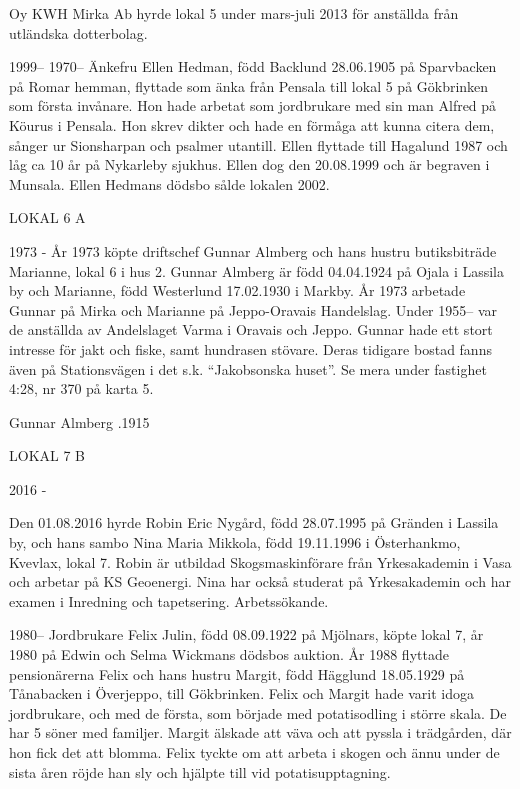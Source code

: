 Oy KWH Mirka Ab hyrde lokal 5 under mars-juli 2013 för anställda från utländska dotterbolag.

 1999--
 1970--
Änkefru Ellen Hedman, född Backlund 28.06.1905 på Sparvbacken på Romar hemman, flyttade som änka från Pensala till lokal 5 på Gökbrinken som första invånare. Hon hade arbetat som jordbrukare med sin man Alfred på Köurus i Pensala. Hon skrev dikter och hade en förmåga att kunna citera dem, sånger ur Sionsharpan och psalmer utantill. Ellen flyttade till Hagalund 1987 och låg ca 10 år på Nykarleby sjukhus. Ellen dog den 20.08.1999 och är begraven i Munsala.
Ellen Hedmans dödsbo sålde lokalen 2002.


LOKAL 6 A

 1973 -
År 1973 köpte driftschef Gunnar Almberg och hans hustru butiksbiträde Marianne, lokal 6 i hus 2. Gunnar Almberg är född 04.04.1924 på Ojala i Lassila by och Marianne, född Westerlund 17.02.1930 i Markby.  År 1973 arbetade Gunnar på Mirka och Marianne på Jeppo-Oravais Handelslag. Under 1955-- var de anställda av Andelslaget Varma i Oravais och Jeppo. Gunnar hade ett stort intresse för jakt och fiske, samt hundrasen stövare.
Deras tidigare bostad fanns även på Stationsvägen i det s.k. ``Jakobsonska huset''.  Se mera under fastighet 4:28, nr 370 på karta 5.

Gunnar Almberg .1915


LOKAL 7 B

 2016 -

Den 01.08.2016 hyrde Robin Eric Nygård, född 28.07.1995 på Gränden i Lassila by, och hans sambo	Nina Maria Mikkola, född 19.11.1996 i Österhankmo, Kvevlax, lokal 7. Robin är utbildad Skogsmaskinförare från Yrkesakademin i Vasa och arbetar på KS Geoenergi.	Nina har också studerat på Yrkesakademin och har examen i Inredning och tapetsering. Arbetssökande.

 1980--
Jordbrukare Felix Julin, född 08.09.1922 på Mjölnars, köpte lokal 7, år 1980 på Edwin och Selma Wickmans dödsbos auktion. År 1988 flyttade pensionärerna Felix och hans hustru Margit, född Hägglund 18.05.1929 på Tånabacken i Överjeppo, till Gökbrinken. Felix och Margit hade varit idoga jordbrukare, och med de första, som började med potatisodling i större skala. De har 5 söner med familjer. Margit älskade att väva och att pyssla i trädgården, där hon fick det att blomma. Felix tyckte om att arbeta i skogen och ännu under de sista åren röjde han sly och hjälpte till vid potatisupptagning.

